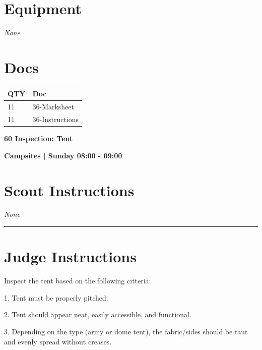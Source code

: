 \documentclass[10pt]{article}
\newcommand{\newtitle}[1]{\begin{center}{\Huge\bfseries #1 }\\ \vspace{5mm}\end{center}}
\newcommand{\newsubtitle}[1]{\begin{center}{\color{grey}\Large\bfseries #1 }\\ \vspace{5mm}\end{center}}
\begin{document}
	\begin{multicols}{2}

		\section*{\faWrench \: Equipment}

				\textit{None}
		
		\vfill\null
		\columnbreak

			\section*{\faFile \: Docs}
		 	\begin{center}
			\begin{tabular}{p{2cm}p{4cm}}

			\textbf{QTY} & \textbf{Doc} \\\toprule
										11&36-Marksheet\\\midrule
										11&36-Instructions\\\midrule
							\end{tabular}
			\end{center}
	

		\vfill\null

		\end{multicols}



	\vspace{1cm}


	\clearpage
		\newtitle{60 Inspection: Tent }
	\newsubtitle{Campsites | Sunday 08:00 - 09:00}
		\setcounter{section}{59}
	\section*{Scout Instructions}
		\textit{None}
	
	\vspace{0.5cm}
	\hrule
	\vspace{0.5cm}

		\section*{Judge Instructions}
		Inspect the tent based on the following criteria:



1. Tent must be properly pitched.

2. Tent should appear neat, easily accessible, and functional. 

3. Depending on the type (army or dome tent), the fabric/sides should be taut and evenly spread without creases.
\end{document}
